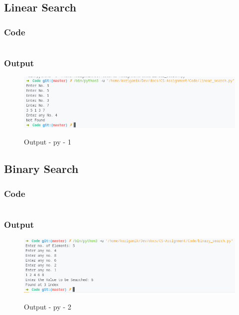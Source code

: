 \subsection{Linear Search}

\subsubsection{Code}
\inputminted[]{python}{../Code/linear_search.py}

\subsubsection{Output}
\begin{figure}[!htb]
  \centering
  \includegraphics[width=5in]{Images/linear_search.png}
  \label{output:py-1}
  \caption{Output - py - 1}
\end{figure}

\pagebreak

\subsection{Binary Search}

\subsubsection{Code}

\inputminted[]{python}{../Code/binary_search.py}

\subsubsection{Output}
\begin{figure}[!htb]
  \centering
  \includegraphics[width=5in]{Images/binary.png}
  \label{output:py-2}
  \caption{Output - py - 2}
\end{figure}
\pagebreak


